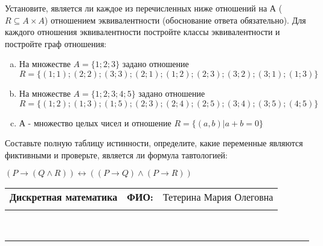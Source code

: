 \documentclass[10pt]{exam}
\newcommand{\class}{Дискретная математика}
\newcommand{\examdate}{}
\begin{document}
\begin{questions}
\question
Установите, является ли каждое из перечисленных ниже отношений на А ($R \subseteq A \times A$) отношением эквивалентности (обоснование ответа обязательно). Для каждого отношения эквивалентности постройте классы 
эквивалентности и постройте граф отношения:
\begin{enumerate} [a)]\setcounter{enumi}{0}
\item На множестве $A = \{1; 2; 3\}$ задано отношение $R = \{(1; 1); (2; 2); (3; 3); (2; 1); (1; 2); (2; 3); (3; 2); (3; 1); (1; 3)\}$
\item На множестве $A = \{1; 2; 3; 4; 5\}$ задано отношение $R = \{(1; 2); (1; 3); (1; 5); (2; 3); (2; 4); (2; 5); (3; 4); (3; 5); (4; 5)\}$
\item А - множество целых чисел и отношение $R = \{(a,b)|a + b = 0\}$
\end{enumerate}\question Составьте полную таблицу истинности, определите, какие переменные являются фиктивными и проверьте, является ли формула тавтологией:

$(P \rightarrow (Q \land R)) \leftrightarrow ((P \rightarrow Q) \land (P \rightarrow R))$

\end{questions}
\newpage
\begin{flushright}
\begin{tabular}{p{2.8in} r l}
\textbf{\class} & \textbf{ФИО:} &Тетерина Мария Олеговна
\\

\textbf{\examdate} &&\\
\end{tabular}\\
\end{flushright}
\rule[1ex]{\textwidth}{.1pt}
\end{document}
